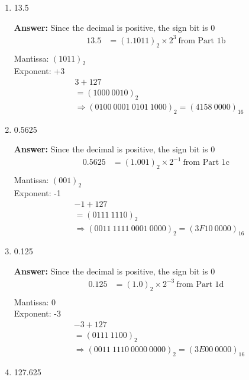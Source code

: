 \documentclass[12pt]{article}
\begin{document}
\begin{enumerate}
\begin{enumerate}
      \item 13.5

      \textbf{Answer:}
      Since the decimal is positive, the sign bit is 0
      \begin{align*}
        13.5 &= (1.1011)_2 \times 2^{3} \ \text{from Part 1b}\\
      \end{align*}
      Mantissa: $(1011)_2$ \\
      Exponent: +3
      \begin{align*}
        &3 + 127 \\
        &= (1000 \ 0010)_2 \\
        &\Rightarrow (0100 \ 0001 \ 0101 \ 1000)_2 = (4158 \ 0000)_{16}
      \end{align*}

      \item 0.5625

      \textbf{Answer:}
      Since the decimal is positive, the sign bit is 0
      \begin{align*}
        0.5625 &= (1.001)_2 \times 2^{-1} \ \text{from Part 1c}\\
      \end{align*}
      Mantissa: $(001)_2$ \\
      Exponent: -1
      \begin{align*}
        &-1 + 127 \\
        &= (0111 \ 1110)_2 \\
        &\Rightarrow (0011 \ 1111 \ 0001 \ 0000)_2 = (3F10 \ 0000)_{16}
      \end{align*}

      \item 0.125

      \textbf{Answer:}
      Since the decimal is positive, the sign bit is 0
      \begin{align*}
        0.125 &= (1.0)_2 \times 2^{-3} \ \text{from Part 1d}\\
      \end{align*}
      Mantissa: 0 \\
      Exponent: -3
      \begin{align*}
        &-3 + 127 \\
        &= (0111 \ 1100)_2 \\
        &\Rightarrow (0011 \ 1110 \ 0000 \ 0000)_2 = (3E00 \ 0000)_{16}
      \end{align*}

      \item 127.625


\end{enumerate}
\end{enumerate}
\end{document}
